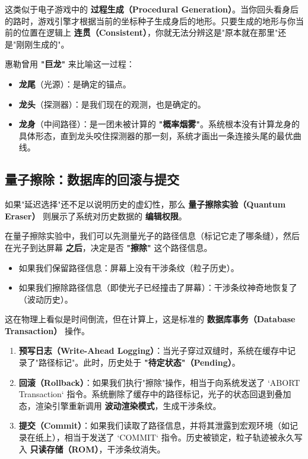 这类似于电子游戏中的 \textbf{过程生成（Procedural Generation）}。当你回头看身后的路时，游戏引擎才根据当前的坐标种子生成身后的地形。只要生成的地形与你当前的位置在逻辑上 \textbf{连贯（Consistent）}，你就无法分辨这是"原本就在那里"还是"刚刚生成的"。

惠勒曾用 \textbf{"巨龙"} 来比喻这一过程：

\begin{itemize}
\item \textbf{龙尾}（光源）：是确定的锚点。

\item \textbf{龙头}（探测器）：是我们现在的观测，也是确定的。

\item \textbf{龙身}（中间路径）：是一团未被计算的 \textbf{"概率烟雾"}。系统根本没有计算龙身的具体形态，直到龙头咬住探测器的那一刻，系统才画出一条连接头尾的最优曲线。
\end{itemize}

\subsection{量子擦除：数据库的回滚与提交}

如果"延迟选择"还不足以说明历史的虚幻性，那么 \textbf{量子擦除实验（Quantum Eraser）} 则展示了系统对历史数据的 \textbf{编辑权限}。

在量子擦除实验中，我们可以先测量光子的路径信息（标记它走了哪条缝），然后在光子到达屏幕 \textbf{之后}，决定是否 \textbf{"擦除"} 这个路径信息。

\begin{itemize}
\item 如果我们保留路径信息：屏幕上没有干涉条纹（粒子历史）。

\item 如果我们擦除路径信息（即使光子已经撞击了屏幕）：干涉条纹神奇地恢复了（波动历史）。
\end{itemize}

这在物理上看似是时间倒流，但在计算上，这是标准的 \textbf{数据库事务（Database Transaction）} 操作。

\begin{enumerate}
\item \textbf{预写日志（Write-Ahead Logging）}：当光子穿过双缝时，系统在缓存中记录了"路径标记"。此时，历史处于 \textbf{"待定状态"（Pending）}。

\item \textbf{回滚（Rollback）}：如果我们执行"擦除"操作，相当于向系统发送了 `ABORT Transaction` 指令。系统删除了缓存中的路径标记，光子的状态回退到叠加态，渲染引擎重新调用 \textbf{波动渲染模式}，生成干涉条纹。

\item \textbf{提交（Commit）}：如果我们读取了路径信息，并将其泄露到宏观环境（如记录在纸上），相当于发送了 `COMMIT` 指令。历史被锁定，粒子轨迹被永久写入 \textbf{只读存储（ROM）}，干涉条纹消失。
\end{enumerate}

